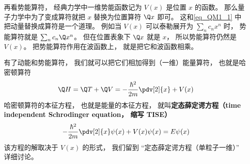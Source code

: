 再看势能算符， 经典力学中一维势能函数记为 $V(x)$ 是位置 $x$ 的函数。 那么量子力学中为了变成算符就把 $x$ 替换为位置算符 $\Q x$ 即可。 这和\autoref{eq_QM1_1} 中把动量替换成算符是一个道理。 例如当 $V(x)$ 可以泰勒展开为 $\sum_n c_n x^n$ 时， 势能算符就是 $\sum_n c_n \Q x^n$。 但在位置表象下 $\Q x$ 就是 $x$， 所以势能算符仍然是 $V(x)$。 把势能算符作用在波函数上， 就是把它和波函数相乘。

有了动能和势能算符， 我们就可以把它们相加得到（一维）能量算符， 也就是哈密顿算符
\begin{equation}
\Q H = \Q T + \Q V = -\frac{\hbar^2}{2m} \pdv[2]{x} + V(x)
\end{equation}
哈密顿算符的本征方程， 也就是能量的本征方程， 就叫\textbf{定态薛定谔方程（time independent Schrodinger equation， 缩写 TISE）}
\begin{equation}
-\frac{\hbar^2}{2m} \pdv[2]{x}\psi(x) + V(x)\psi(x) = E\psi(x)
\end{equation}
该方程的解取决于 $V(x)$ 的形式， 我们留到 “定态薛定谔方程（单粒子一维）” 详细讨论。
